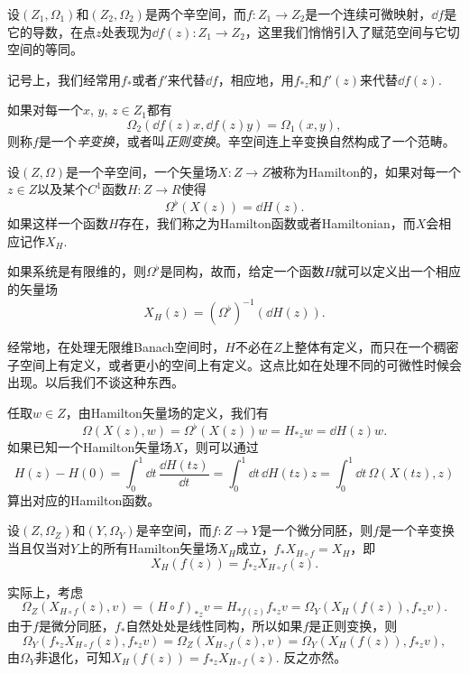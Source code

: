 \begin{para}
	设$(Z_1,\Omega_1)$和$(Z_2,\Omega_2)$是两个辛空间，而$f:Z_1\to Z_2$是一个连续可微映射，$\dd f$是它的导数，在点$z$处表现为$\dd f(z):Z_1\to Z_2$，这里我们悄悄引入了赋范空间与它切空间的等同。

	记号上，我们经常用$f_*$或者$f'$来代替$\dd f$，相应地，用$f_{*z}$和$f'(z)$来代替$\dd f(z)$.

	如果对每一个$x$, $y$, $z\in Z_1$都有
	\[
		\Omega_2\left(\dd f(z)x,\dd f(z)y\right)=\Omega_1(x,y),
	\]
	则称$f$是一个\textit{辛变换}，或者叫\textit{正则变换}。辛空间连上辛变换自然构成了一个范畴。
\end{para}

\begin{para}
	设$(Z,\Omega)$是一个辛空间，一个矢量场$X:Z\to Z$被称为Hamilton的，如果对每一个$z\in Z$以及某个$C^1$函数$H:Z\to R$使得
	\[
	\Omega^\flat (X(z))=\dd H(z).
	\]
	如果这样一个函数$H$存在，我们称之为Hamilton函数或者Hamiltonian，而$X$会相应记作$X_H$. 

	如果系统是有限维的，则$\Omega^\flat$是同构，故而，给定一个函数$H$就可以定义出一个相应的矢量场
	\[
		X_H(z)=(\Omega^\flat)^{-1}\left(\dd H(z)\right).
	\]

	经常地，在处理无限维Banach空间时，$H$不必在$Z$上整体有定义，而只在一个稠密子空间上有定义，或者更小的空间上有定义。这点比如在处理不同的可微性时候会出现。以后我们不谈这种东西。

	任取$w\in Z$，由Hamilton矢量场的定义，我们有
	\[
	\Omega(X(z),w)=\Omega^\flat (X(z))w=H_{*z}w=\dd H(z)w.
	\]
	如果已知一个Hamilton矢量场$X$，则可以通过
	\[
	H(z)-H(0)=\int_{0}^1 \dd t\,\frac{\dd H(tz)}{\dd t}=\int_{0}^1 \dd t\,\dd H(tz)z=\int_{0}^1 \dd t\,\Omega(X(tz),z)
	\]
	算出对应的Hamilton函数。
\end{para}

\begin{pro}
	设$(Z,\Omega_Z)$和$(Y,\Omega_Y)$是辛空间，而$f:Z\to Y$是一个微分同胚，则$f$是一个辛变换当且仅当对$Y$上的所有Hamilton矢量场$X_H$成立，$f_*X_{H\circ f}=X_{H}$，即
	\[
		X_H(f(z))=f_{*z}X_{H\circ f}(z).
	\]
\end{pro}

实际上，考虑
\[
	\Omega_Z(X_{H\circ f}(z),v)=(H\circ f)_{*z}v=H_{*f(z)}f_{*z}v=\Omega_Y(X_H(f(z)),f_{*z}v).
\]
由于$f$是微分同胚，$f_*$自然处处是线性同构，所以如果$f$是正则变换，则
\[
	\Omega_Y(f_{*z}X_{H\circ f}(z),f_{*z}v)=\Omega_Z(X_{H\circ f}(z),v)=\Omega_Y(X_H(f(z)),f_{*z}v),
\]
由$\Omega_Y$非退化，可知$X_H(f(z))=f_{*z}X_{H\circ f}(z)$. 反之亦然。


